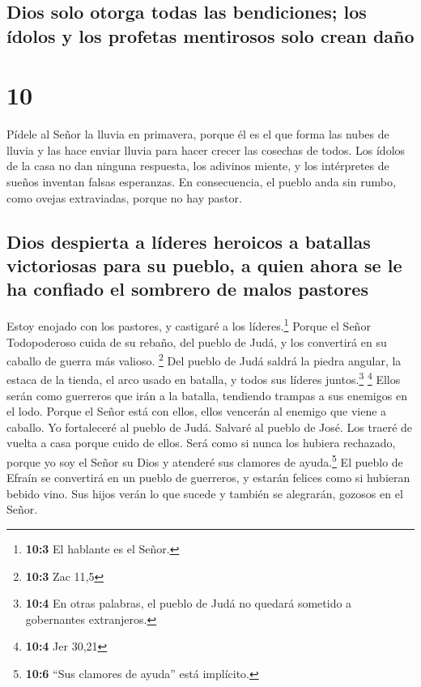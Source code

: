 \hypertarget{dios-solo-otorga-todas-las-bendiciones-los-uxeddolos-y-los-profetas-mentirosos-solo-crean-dauxf1o}{%
\subsection{Dios solo otorga todas las bendiciones; los ídolos y los
profetas mentirosos solo crean
daño}\label{dios-solo-otorga-todas-las-bendiciones-los-uxeddolos-y-los-profetas-mentirosos-solo-crean-dauxf1o}}

\hypertarget{section-9}{%
\section{10}\label{section-9}}

 Pídele al Señor la lluvia en primavera, porque él es el
que forma las nubes de lluvia y las hace enviar lluvia para hacer crecer
las cosechas de todos.  Los ídolos de la casa no dan
ninguna respuesta, los adivinos miente, y los intérpretes de sueños
inventan falsas esperanzas. En consecuencia, el pueblo anda sin rumbo,
como ovejas extraviadas, porque no hay pastor.

\hypertarget{dios-despierta-a-luxedderes-heroicos-a-batallas-victoriosas-para-su-pueblo-a-quien-ahora-se-le-ha-confiado-el-sombrero-de-malos-pastores}{%
\subsection{Dios despierta a líderes heroicos a batallas victoriosas
para su pueblo, a quien ahora se le ha confiado el sombrero de malos
pastores}\label{dios-despierta-a-luxedderes-heroicos-a-batallas-victoriosas-para-su-pueblo-a-quien-ahora-se-le-ha-confiado-el-sombrero-de-malos-pastores}}

 Estoy enojado con los pastores, y castigaré a los
líderes.\footnote{\textbf{10:3} El hablante es el Señor.} Porque el
Señor Todopoderoso cuida de su rebaño, del pueblo de Judá, y los
convertirá en su caballo de guerra más valioso. \footnote{\textbf{10:3}
  Zac 11,5}  Del pueblo de Judá saldrá la piedra angular,
la estaca de la tienda, el arco usado en batalla, y todos sus líderes
juntos.\footnote{\textbf{10:4} En otras palabras, el pueblo de Judá no
  quedará sometido a gobernantes extranjeros.} \footnote{\textbf{10:4}
  Jer 30,21}  Ellos serán como guerreros que irán a la
batalla, tendiendo trampas a sus enemigos en el lodo. Porque el Señor
está con ellos, ellos vencerán al enemigo que viene a caballo.
 Yo fortaleceré al pueblo de Judá. Salvaré al pueblo de
José. Los traeré de vuelta a casa porque cuido de ellos. Será como si
nunca los hubiera rechazado, porque yo soy el Señor su Dios y atenderé
sus clamores de ayuda.\footnote{\textbf{10:6} ``Sus clamores de ayuda''
  está implícito.}  El pueblo de Efraín se convertirá en
un pueblo de guerreros, y estarán felices como si hubieran bebido vino.
Sus hijos verán lo que sucede y también se alegrarán, gozosos en el
Señor.

